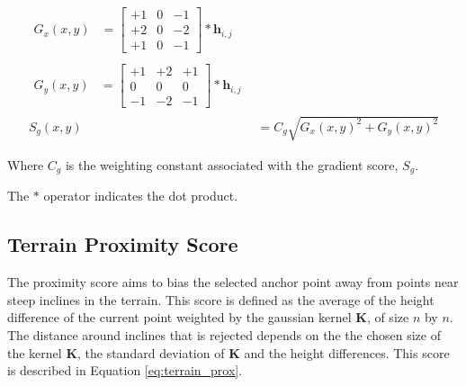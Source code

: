        \begin{align}
            \begin{split} \label{eq:sobelgx}
                G_x(x,y) &=  \begin{bmatrix}
                                +1 & 0 & -1\\
                                +2 & 0 & -2\\
                                +1 & 0 & -1
                            \end{bmatrix}
                            *\boldsymbol{h}_{i,j}
            \end{split}\\
            \begin{split} \label{eq:sobelgy}
                G_y(x,y) &=  \begin{bmatrix}
                                +1 & +2 & +1\\
                                0 & 0 & 0\\
                                -1 & -2 & -1
                            \end{bmatrix}
                            *\boldsymbol{h}_{i,j}
            \end{split}\\
            S_g(x,y) &= C_g\sqrt{G_x(x,y)^2 + G_y(x,y)^2} \label{eq:sobelsg}
        \end{align}

        \begin{center}
            Where \(C_g\) is the weighting constant associated with the gradient score, \(S_g\).

            The \(*\) operator indicates the dot product.
        \end{center}

    \subsection{Terrain Proximity Score}
    The proximity score aims to bias the selected anchor point away from points near steep inclines in the terrain. This score is defined as the average of the height
    difference of the current point weighted by the gaussian kernel \(\boldsymbol{K}\), of size \(n\) by \(n\). The distance around inclines that is rejected depends on the the
    chosen size of the kernel \(\boldsymbol{K}\), the standard deviation of \(\boldsymbol{K}\) and the height differences. This score is described in Equation
    \ref{eq:terrain_prox}.

